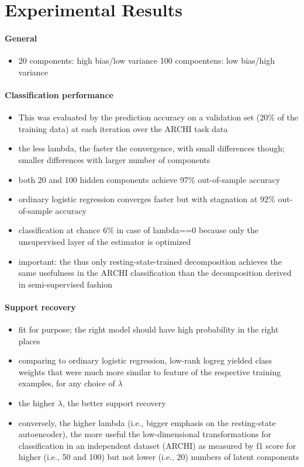 \documentclass{article} %
\begin{document}
\section{Experimental Results}
\paragraph{General}
\begin{itemize}
\item{20 components: high bias/low variance
100 compoentens: low bias/high variance}
\end{itemize}

\paragraph{Classification performance}
\begin{itemize}
  \item{This was evaluated by the prediction
accuracy on a validation set (20\% of the training data) at each iteration
over the ARCHI task data}
  \item{the less lambda, the faster the convergence, with small differences
  though; smaller differences with larger number of components}
  \item{both 20 and 100 hidden components achieve 97\% out-of-sample
  accuracy}
  \item{ordinary logistic regression converges faster but with stagnation at
  92\% out-of-sample accuracy}
  \item{classification at chance 6\% in case of lambda==0 because 
  only the unsupervised layer of the estimator is optimized}
  \item{important: the thus only resting-state-trained decomposition achieves
  the same usefulness in the ARCHI classification than the
  decomposition derived in semi-supervised fashion}
\end{itemize}

\paragraph{Support recovery}
\begin{itemize}
  \item{fit for purpose; the right model should have
  high probability in the right places}
  \item{comparing to ordinary logistic regression, low-rank logreg yielded class weights 
  that were much more similar to feature of the respective training examples,
  for any choice of $\lambda$}
  \item{the higher $\lambda$, the better support recovery}
  \item{conversely, the higher lambda (i.e., bigger emphasis on the
  resting-state autoencoder), the more useful the low-dimensional transformations
  for classification in an independent dataset (ARCHI) as measured by f1 score
  for higher (i.e., 50 and 100) but not lower (i.e., 20) numbers
  of latent components}
\end{itemize}
\end{document}

